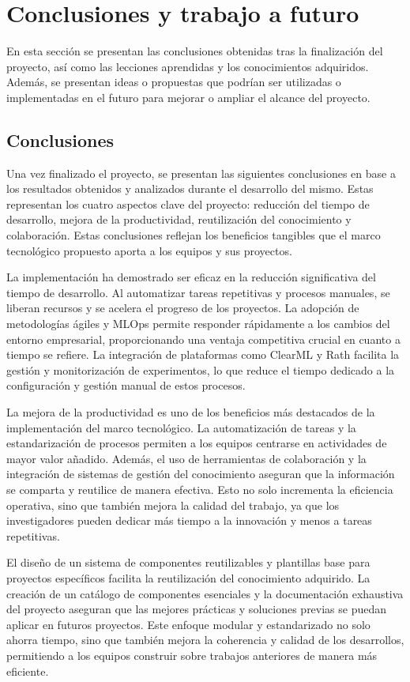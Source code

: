 \section{Conclusiones y trabajo a futuro}
En esta sección se presentan las conclusiones obtenidas tras la finalización 
del proyecto, así como las lecciones aprendidas y los conocimientos adquiridos. 
Además, se presentan ideas o propuestas que podrían ser utilizadas o implementadas 
en el futuro para mejorar o ampliar el alcance del proyecto.

\subsection{Conclusiones}
Una vez finalizado el proyecto, se presentan las siguientes conclusiones en 
base a los resultados obtenidos y analizados durante el desarrollo del mismo.
Estas representan los cuatro aspectos clave del proyecto: reducción del tiempo de desarrollo, 
mejora de la productividad, reutilización del conocimiento y colaboración. Estas conclusiones 
reflejan los beneficios tangibles que el marco tecnológico propuesto aporta a los 
equipos y sus proyectos.\medskip

La implementación ha demostrado ser eficaz en la reducción significativa del tiempo 
de de\-sarro\-llo. Al automatizar tareas repetitivas y procesos manuales, se liberan 
recursos y se acelera el progreso de los proyectos. La adopción de metodologías 
ágiles y MLOps permite responder rápidamente a los cambios del entorno empresarial, 
proporcionando una ventaja competitiva crucial en cuanto a tiempo se refiere. La 
integración de plataformas como ClearML y Rath facilita la gestión y 
monitorización de experimentos, lo que reduce el tiempo dedicado a la configuración 
y gestión manual de estos procesos.\medskip

La mejora de la productividad es uno de los beneficios más destacados de la 
implementación del marco tecnológico. La automatización de tareas y la 
estandarización de procesos permiten a los equipos centrarse en actividades 
de mayor valor añadido. Además, el uso de herramientas de colaboración y la 
integración de sistemas de gestión del conocimiento aseguran que la información 
se comparta y reutilice de manera efectiva. Esto no solo incrementa la eficiencia 
operativa, sino que también mejora la calidad del trabajo, ya que los investigadores 
pueden dedicar más tiempo a la innovación y menos a tareas repetitivas.\medskip

El diseño de un sistema de componentes reutilizables y plantillas base para 
proyectos específicos facilita la reutilización del conocimiento adquirido. 
La creación de un catálogo de componentes esenciales y la documentación exhaustiva 
del proyecto aseguran que las mejores prácticas y soluciones previas se 
puedan aplicar en futuros proyectos. Este enfoque modular y estandarizado no 
solo ahorra tiempo, sino que también mejora la coherencia y calidad de los 
desarrollos, permitiendo a los equipos construir sobre trabajos anteriores 
de manera más eficiente.\medskip


